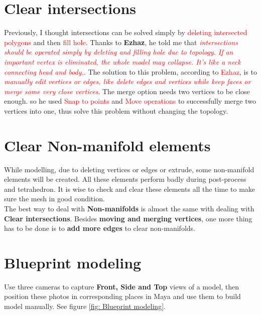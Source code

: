 \section{Clear intersections}
Previously, I thought intersections can be solved simply by \textcolor{red}{deleting intersected polygons} and then \textcolor{red}{fill hole}. Thanks to \textbf{Ezhaz}, he told me that \textcolor{red}{\textit{intersections should be operated simply by deleting and filling hole due to topology. If an important vertex is eliminated, the whole model may collapse. It's like a neck connecting head and body.}}. The solution to this problem, according to \textcolor{red}{Ezhaz}, is to \textcolor{red}{\textit{manually edit vertices or edges, like delete edges and vertices while keep faces or merge some very close vertices}}. The merge option needs two vertices to be close enough. so he used \textcolor{red}{Snap to points} and \textcolor{red}{Move operations} to successfully merge two vertices into one, thus solve this problem without changing the topology.

\section{Clear Non-manifold elements}
While modelling, due to deleting vertices or edges or extrude, some non-manifold elements will be created. All these elements perform badly during post-process and tetrahedron. It is wise to check and clear these elements all the time to make sure the mesh in good condition.\\

The best way to deal with \textbf{Non-manifolds} is almost the same with dealing with \textbf{Clear intersections}. Besides \textbf{moving and merging vertices}, one more thing has to be done is to \textbf{add more edges} to clear non-manifolds.\\

\section{Blueprint modeling}
Use three cameras to capture \textbf{Front, Side and Top} views of a model, then position these photos in corresponding places in Maya and use them to build model manually. See figure \ref{fig: Blueprint modeling}.

